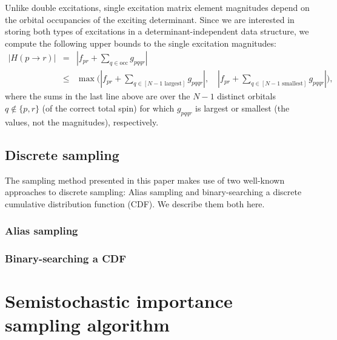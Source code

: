 \documentclass[english]{article}
\begin{document}
Unlike double excitations, single excitation matrix element magnitudes depend on the orbital occupancies of the exciting determinant. Since we are interested in storing both types of excitations in a determinant-independent data structure, we compute the following upper bounds to the single excitation magnitudes:
\begin{eqnarray}
	\left|H(p\rightarrow r)\right| &=& \left|f_{pr} + \sum_{q\in \textrm{occ}} g_{pqqr}\right|\\
	&\le&\max\Bigg( \left|f_{pr} + \sum_{q\in [N-1 \textrm{ largest}]} g_{pqqr}\right|,
	 \quad \left|f_{pr} + \sum_{q\in [N-1 \textrm{ smallest}]} g_{pqqr}\right|\Bigg),
\end{eqnarray}
where the sums in the last line above are over the $N-1$ distinct orbitals $q\notin\{p,r\}$ (of the correct total spin) for which $g_{pqqr}$ is largest or smallest (the values, not the magnitudes), respectively.

\subsection{Discrete sampling}
The sampling method presented in this paper makes use of two well-known approaches to discrete sampling: Alias sampling and binary-searching a discrete cumulative distribution function (CDF). We describe them both here.

\subsubsection{Alias sampling}

\subsubsection{Binary-searching a CDF}

\section{Semistochastic importance sampling algorithm}
\end{document}
